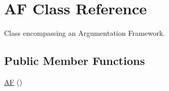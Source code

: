 \hypertarget{classAF}{\section{A\-F Class Reference}
\label{classAF}
}


Class encompassing an Argumentation Framework.  


\subsection*{Public Member Functions}
\begin{DoxyCompactItemize}
\item 
\hypertarget{classAF_ad40517371141b07b06a072d3365bb6de}{\hyperlink{classAF_ad40517371141b07b06a072d3365bb6de}{A\-F} ()}\label{classAF_ad40517371141b07b06a072d3365bb6de}


\end{DoxyCompactItemize}
